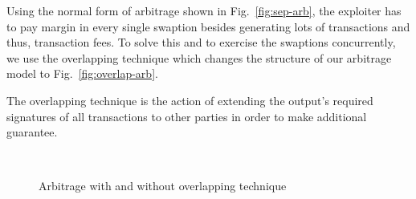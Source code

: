 Using the normal form of arbitrage shown in Fig.~\ref{fig:sep-arb}, the exploiter has to pay margin in every single swaption besides generating lots of transactions and thus, transaction fees. To solve this and to exercise the swaptions concurrently, we use the overlapping technique which changes the structure of our arbitrage model to Fig.~\ref{fig:overlap-arb}.

The overlapping technique is the action of extending the output's required signatures of all transactions to other parties in order to make additional guarantee.

\begin{figure}[htp]
    \caption{Arbitrage with and without overlapping technique}
    ~
\end{figure}



